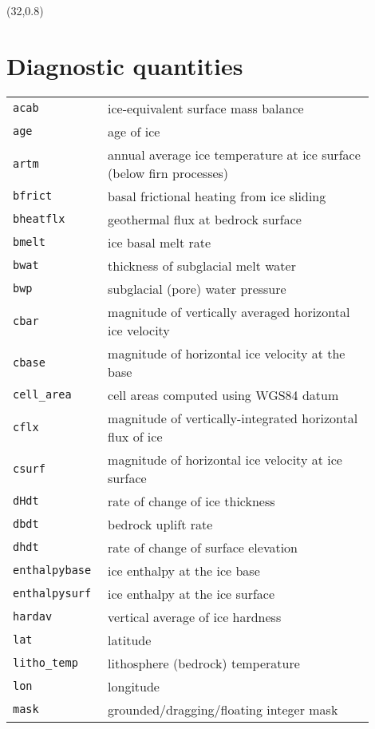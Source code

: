 \documentclass[landscape]{article}
\begin{document}
\begin{textblock}{15}(32,0.8)
\section{Diagnostic quantities}
\label{sec:diagnostics}
\begin{tabular}{@{}p{0.2\linewidth}p{0.7\linewidth}@{}}
  \texttt{acab} &  ice-equivalent surface mass balance\\
  \texttt{age} &  age of ice \\
  \texttt{artm} &  annual average ice temperature at ice surface (below firn processes)\\
  \texttt{bfrict} &  basal frictional heating from ice sliding \\
  \texttt{bheatflx} &  geothermal flux at bedrock surface \\
  \texttt{bmelt} &  ice basal melt rate\\
  \texttt{bwat} &  thickness of subglacial melt water \\
  \texttt{bwp} &  subglacial (pore) water pressure \\
  \texttt{cbar} &  magnitude of vertically averaged horizontal ice velocity \\
  \texttt{cbase} &  magnitude of horizontal ice velocity at the base\\
  \texttt{cell_area} & cell areas computed using WGS84 datum\\
  \texttt{cflx} &  magnitude of vertically-integrated horizontal flux of ice \\
  \texttt{csurf} &  magnitude of horizontal ice velocity at ice surface \\
  \texttt{dHdt} &  rate of change of ice thickness \\
  \texttt{dbdt} &  bedrock uplift rate \\
  \texttt{dhdt} &  rate of change of surface elevation \\
  \texttt{enthalpybase} &  ice enthalpy at the ice base\\
  \texttt{enthalpysurf} &  ice enthalpy at the ice surface\\
  \texttt{hardav} &  vertical average of ice hardness \\
  \texttt{lat} &  latitude \\
  \texttt{litho_temp} &  lithosphere (bedrock) temperature\\
  \texttt{lon} &  longitude \\
  \texttt{mask} &  grounded/dragging/floating integer mask \\

\end{tabular}
\end{textblock}
\end{document}
